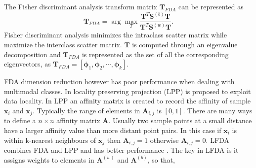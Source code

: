\documentclass[10pt,twocolumn,letterpaper]{article}
\begin{document}
The Fisher discriminant analysis transform matrix $\bm{T}_{FDA}$ can be represented as 
\begin{equation}
\bm{T}_{FDA} = \arg\max_T \frac{\bm{T}^T\bm{S}^{(b)}\bm{T}}{\bm{T}^T\bm{S}^{(w)}\bm{T}}.
\end{equation}
Fisher discriminant analysis minimizes the intraclass scatter matrix while maximize the interclass scatter matrix. $\bm{T}$ is computed through an eigenvalue decomposition and $\bm{T}_{FDA}$ is represented as the set of all the corresponding eigenvectors, as $ \bm{T}_{FDA} = [\bm{\phi}_1,\bm{\phi}_2,\cdots,\bm{\phi}_k]$.

FDA dimension reduction however has poor performance when dealing with multimodal classes. In \cite{LPP} locality preserving projection (LPP) is proposed to exploit data locality. In LPP an affinity matrix is created to record the affinity of sample $\bm{x}_i$ and $\bm{x}_j$.  Typically the range of elements in $\bm{A}_{i,j}$ is $[0,1]$. There are many ways to define a $n \times n$ affinity matrix $\bm{A}$. Usually two sample points at a small distance have a larger affinity value than more distant point pairs. In this case if  $\bm{x}_i$ is within k-nearest neighbours of $\bm{x}_j$ then $\bm{A}_{i,j} = 1$ otherwise  $\bm{A}_{i,j} = 0$.  LFDA combines FDA and LPP and has better performance \cite{KLFDA}. The key in LFDA is it assigns weights to elements in $\bm{A}^{(w)}$ and $\bm{A}^{(b)}$, so that,

%
%
\end{document}
